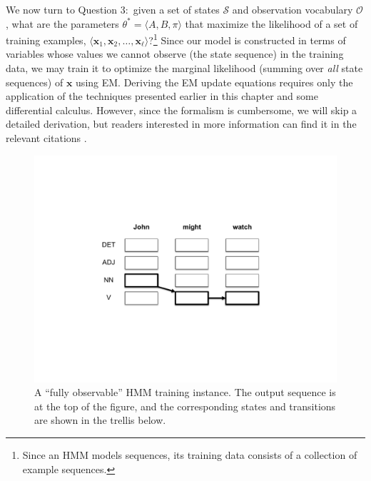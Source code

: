 We now turn to Question 3:\ given a set of states $\mathcal{S}$ and
observation vocabulary $\mathcal{O}$, what are the parameters
$\theta^* = \langle A,B,\pi \rangle$ that maximize the likelihood of a
set of training examples, $\langle \textbf{x}_1,\textbf{x}_2,\ldots,
\textbf{x}_{\ell} \rangle$?\footnote{Since an HMM models sequences,
  its training data consists of a collection of example sequences.}
Since our model is constructed in terms of variables whose values we
cannot observe (the state sequence) in the training data, we may train
it to optimize the marginal likelihood (summing over \emph{all} state
sequences) of $\textbf{x}$ using EM.  Deriving the EM update equations
requires only the application of the techniques presented earlier in
this chapter and some differential calculus.  However, since the
formalism is cumbersome, we will skip a detailed derivation, but
readers interested in more information can find it in the relevant
citations \cite{Jelinek_1997,Rabiner_1990}.

\begin{figure}[t]
\begin{center}
\includegraphics[scale=0.55]{figures/fig-ch6-q3a.pdf}
\end{center}\caption{A ``fully observable'' HMM training instance.  The output sequence is at the top of the figure, and the corresponding states and transitions are shown in the trellis below.}\label{chapter6_observable_hmm}
\end{figure}

